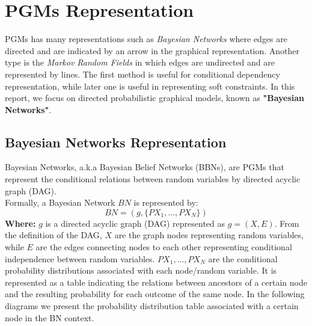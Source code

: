 \documentclass{article}
\begin{document}
\section{PGMs Representation}
PGMs has many representations such as \textit{Bayesian Networks} where edges are directed and are indicated by an arrow in the graphical representation. Another type is the \textit{Markov Random Fields} in which edges are undirected and are represented by lines. The first method is useful for conditional dependency representation, while later one is useful in representing soft constraints. In this report, we focus on directed probabilistic graphical models, known as \textbf{"Bayesian Networks"}.
\subsection{Bayesian Networks Representation}
Bayesian Networks, a.k.a Bayesian Belief Networks (BBNs), are PGMs that represent the conditional relations between random variables by directed acyclic graph (DAG). \\
Formally, a Bayesian Network $BN$ is represented by:
\begin{equation}
BN = (g, \{ P{X_1},..., P{X_N}  \})
\end{equation}
\textbf{Where:} $g$ is a directed acyclic graph (DAG) represented as $g=(X,E)$. From the definition of the DAG, $X$ are the graph nodes representing random variables, while $E$ are the edges connecting nodes to each other representing conditional independence between random variables. $P{X_1},..., P{X_N}$ are the conditional probability distributions associated with each node/random variable. It is represented as a table indicating the relations between ancestors of a certain node and the resulting probability for each outcome of the same node. In the following diagrams we present the probability distribution table associated with a certain node in the BN context.
\end{document}
